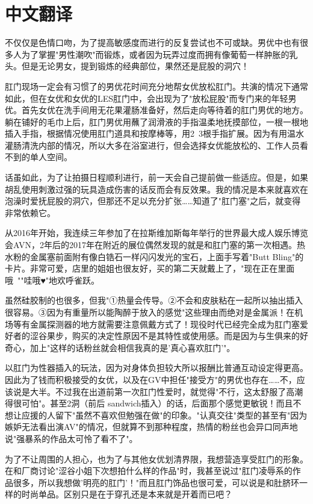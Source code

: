 \documentclass[12pt,UTF8]{ctexbook}
\begin{document}
\switchcolumn

\section*{中文翻译}

不仅仅是色情口吻，为了提高敏感度而进行的反复尝试也不可或缺。男优中也有很多人为了掌握"男性潮吹"而锻炼，或者因为玩弄过度而拥有像葡萄一样肿胀的乳头。但是无论男女，提到锻炼的经典部位，果然还是屁股的洞穴！

肛门现场一定会有习惯了的男优花时间充分地帮女优放松肛门。共演的情况下通常如此，但在女优和女优的LES肛门中，会出现为了"放松屁股"而专门来的年轻男优。首先女优在洗手间用无花果灌肠准备好，然后走向等待着的肛门男优的地方。躺在铺好的毛巾上后，肛门男优用蘸了润滑液的手指温柔地抚摸部位，一根一根地插入手指，根据情况使用肛门道具和按摩棒等，用2~3根手指扩展。因为有用温水灌肠清洗内部的情况，所以大多在浴室进行，但会选择女优能放松的、工作人员看不到的单人空间。

话虽如此，为了让拍摄日程顺利进行，前一天会自己提前做一些适应。但是，如果胡乱使用刺激过强的玩具造成伤害的话反而会有反效果。我的情况是本来就喜欢在泡澡时爱抚屁股的洞穴，但那还不足以充分扩张……知道了"肛门塞"之后，就变得非常依赖它。

从2016年开始，我连续三年参加了在拉斯维加斯每年举行的世界最大成人娱乐博览会AVN，2年后的2017年在附近的展位偶然发现的就是和肛门塞的第一次相遇。热水粉的金属塞前面附有像白锆石一样闪闪发光的宝石，上面手写着"Butt Bling"的卡片。非常可爱，店里的姐姐也很友好，买的第二天就戴上了，"现在正在里面哦~""哇哦♥"地欢呼雀跃。

虽然硅胶制的也很多，但我"①热量会传导。②不会和皮肤粘在一起所以抽出插入很容易。③因为有重量所以能陶醉于放入的感觉"这些理由而绝对是金属派！在机场等有金属探测器的地方就需要注意佩戴方式了！现役时代已经完全成为肛门塞爱好者的涩谷果步，购买的决定性原因不是其特性或使用感。而是因为与生俱来的好奇心，加上"这样的话粉丝就会相信我真的是'真心喜欢肛门'"。

以肛门为性器插入的玩法，因为对身体负担较大所以报酬比普通互动设定得更高。因此为了钱而积极接受的女优，以及在GV中担任"接受方"的男优也存在……不，应该说是大半。不过我在出道前第一次肛门性爱时，就觉得"不行，这太舒服了高潮得很可怕"。甚至2洞（前后 sandwich插入）的话，后面那个感觉更敏锐！而且不想让应援的人留下"虽然不喜欢但勉强在做"的印象。"认真交往"类型的甚至有"因为嫉妒无法看出演AV"的情况，但就算不到那种程度，热情的粉丝也会异口同声地说"强暴系的作品太可怜了看不了"。

为了不让周围的人担心，也为了与其他女优划清界限，我想营造享受肛门的形象。在和厂商讨论"涩谷小姐下次想拍什么样的作品"时，我甚至说过"肛门凌辱系的作品很多，所以我想做'明亮的肛门'！"而且肛门饰品也很可爱，可以说是和肚脐环一样的时尚单品。区别只是在于穿孔还是本来就是开着而已吧？
\end{document}
